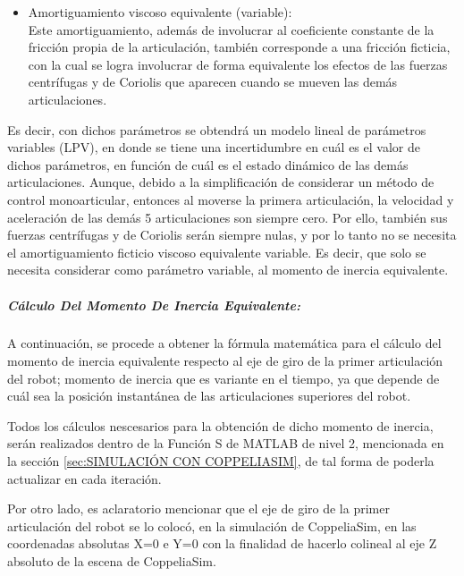\documentclass{article}
\begin{document}
\begin{sloppypar}
\begin{itemize}
    \item Amortiguamiento viscoso equivalente (variable):
    \\ Este amortiguamiento, además de involucrar al coeficiente constante de la fricción  propia de la articulación, también corresponde a una fricción ficticia, con la cual se logra involucrar de forma equivalente los efectos de las fuerzas centrífugas y de Coriolis que aparecen cuando se mueven las demás articulaciones.
\end{itemize}
Es decir, con dichos parámetros se obtendrá un modelo lineal de parámetros variables (LPV), en donde se tiene una incertidumbre en cuál es el valor de dichos parámetros, en función de cuál es el estado dinámico de las demás articulaciones.
Aunque, debido a la simplificación de considerar un método de control monoarticular, entonces al moverse la primera articulación, la velocidad y aceleración de las demás 5 articulaciones son siempre cero. Por ello, también sus fuerzas centrífugas y de Coriolis serán siempre nulas, y por lo tanto no se necesita el amortiguamiento ficticio viscoso equivalente variable. Es decir, que solo se necesita considerar como parámetro variable, al momento de inercia equivalente.

\hfill

\subparagraph{Cálculo Del Momento De Inercia Equivalente:}
\label{sec:Cálculo Del Momento De Inercia Equivalente:}

\hfill

\hfill

A continuación, se procede a obtener la fórmula matemática para el cálculo del momento de inercia equivalente respecto al eje de giro de la primer articulación del robot; momento de inercia que es variante en el tiempo, ya que depende de cuál sea la posición instantánea de las articulaciones superiores del robot.

Todos los cálculos nescesarios para la obtención de dicho momento de inercia, serán realizados dentro de la Función S de MATLAB de nivel 2, mencionada en la sección \ref{sec:SIMULACIÓN CON COPPELIASIM}, de tal forma de poderla actualizar en cada iteración.

Por otro lado, es aclaratorio mencionar que el eje de giro de la primer articulación del robot se lo colocó, en la simulación de CoppeliaSim, en las coordenadas absolutas X=0 e Y=0 con la finalidad de hacerlo colineal al eje Z absoluto de la escena de CoppeliaSim.


\end{sloppypar}
\end{document}
